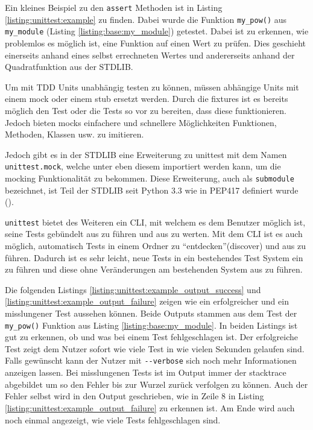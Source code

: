 Ein kleines Beispiel zu den \lstinline{assert} Methoden ist in Listing
\ref{listing:unittest:example} zu finden. Dabei wurde die Funktion
\lstinline{my_pow()} aus \lstinline{my_module} (Listing
\ref{listing:base:my_module}) getestet. Dabei ist zu erkennen, wie problemlos
es möglich ist, eine Funktion auf einen Wert zu prüfen. Dies geschieht
einerseits anhand eines selbst errechneten Wertes und andererseits anhand der
Quadratfunktion aus der STDLIB.

Um mit TDD Units unabhängig testen zu können, müssen abhängige Units mit einem
\Gls{mock} oder einem \Gls{stub} ersetzt werden. Durch die \Glspl{fixture} ist
es bereits möglich den Test oder die Tests so vor zu
bereiten, dass diese funktionieren. Jedoch bieten \Glspl{mock} einfachere und
schnellere Möglichkeiten Funktionen, Methoden, Klassen usw. zu imitieren.

Jedoch gibt es in der STDLIB eine Erweiterung zu unittest mit dem Namen
\lstinline{unittest.mock}, welche unter eben diesem importiert werden kann, um 
die \gls{mock}ing Funktionalität zu bekommen. Diese Erweiterung, auch als
\lstinline{submodule} bezeichnet, ist Teil der STDLIB seit Python 3.3 wie in
PEP417 definiert wurde (\cite{python.org:PEP417}).

\lstinline{unittest} bietet des Weiteren ein CLI, mit welchem es dem Benutzer 
möglich ist, seine Tests gebündelt aus zu führen und aus zu werten. Mit dem CLI 
ist es auch möglich, automatisch Tests in einem Ordner zu 
"`entdecken"'(discover) und aus zu führen. Dadurch ist es sehr leicht, neue 
Tests in ein bestehendes Test System ein zu führen und diese ohne Veränderungen 
am bestehenden System aus zu führen.

Die folgenden Listings \ref{listing:unittest:example_output_success} und
\ref{listing:unittest:example_output_failure} zeigen wie ein erfolgreicher und 
ein misslungener Test aussehen können. Beide Outputs stammen aus dem Test
der \lstinline{my_pow()} Funktion aus Listing \ref{listing:base:my_module}.
In beiden Listings ist gut zu erkennen, ob und was bei einem Test 
fehlgeschlagen ist. Der erfolgreiche Test zeigt dem Nutzer sofort wie viele 
Test in wie vielen Sekunden gelaufen sind. Falls gewünscht kann der Nutzer mit  
\lstinline|--verbose| sich noch mehr Informationen anzeigen lassen.
Bei misslungenen Tests ist im Output immer der \gls{stacktrace} abgebildet um 
so den Fehler bis zur Wurzel zurück verfolgen zu können. Auch der Fehler selbst 
wird in den Output geschrieben, wie in Zeile 8 in Listing 
\ref{listing:unittest:example_output_failure} zu erkennen ist. Am Ende wird 
auch noch einmal angezeigt, wie viele Tests fehlgeschlagen sind.

